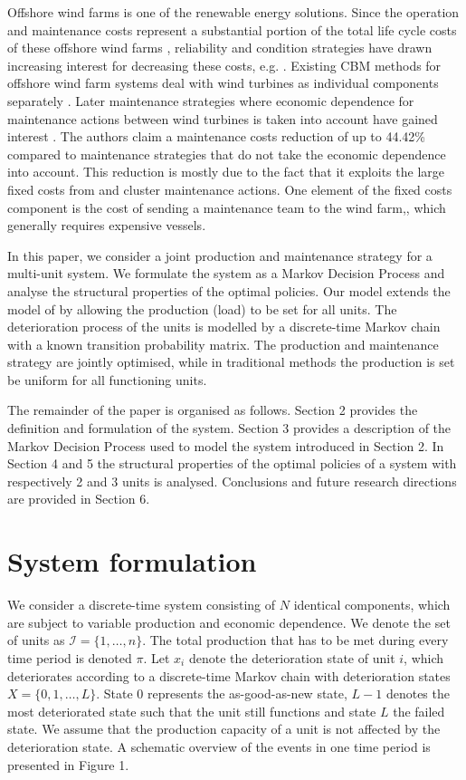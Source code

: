 \documentclass[a4paper,12pt]{article}
\begin{document}
Offshore wind farms is one of the renewable energy solutions. Since the operation and maintenance costs represent a substantial portion of the total life cycle costs of these offshore wind farms \cite{hau2003wind}, reliability and condition strategies have drawn increasing interest for decreasing these costs, e.g. \cite{krokoszinski2003efficiency}. Existing CBM methods for offshore wind farm systems deal with wind turbines as individual components separately \citep{avner2007reliability}. Later maintenance strategies where economic dependence for maintenance actions between wind turbines is taken into account have gained interest \citep{tian2011condition}. The authors claim a maintenance costs reduction of up to 44.42\% compared to maintenance strategies that do not take the economic dependence into account. This reduction is mostly due to the fact that it exploits the large fixed costs from and cluster maintenance actions. One element of the fixed costs component is the cost of sending a maintenance team to the wind farm,, which generally requires expensive vessels.

In this paper, we consider a joint production and maintenance strategy for a multi-unit system. We formulate the system as a Markov Decision Process and analyse the structural properties of the optimal policies. Our model extends the model of \cite{OLDEKEIZER2018319} by allowing the production (load) to be set for all units. The deterioration process of the units is modelled by a discrete-time Markov chain with a known transition probability matrix. The production and maintenance strategy are jointly optimised, while in traditional methods the production is set be uniform for all functioning units. 

The remainder of the paper is organised as follows. Section 2 provides the definition and formulation of the system. Section 3 provides a description of the Markov Decision Process used to model the system introduced in Section 2. In Section 4 and 5 the structural properties of the optimal policies of a system with respectively 2 and 3 units is analysed. Conclusions and future research directions are provided in Section 6.


\section{System formulation}
We consider a discrete-time system consisting of $N$ identical components, which are subject to variable production and economic dependence. We denote the set of units as $\mathcal{I} = \{1, \dots, n\}$. The total production that has to be met during every time period is denoted $\pi$.  Let $x_i$ denote the deterioration state of unit $i$, which deteriorates according to a discrete-time Markov chain with deterioration states $X = \{0, 1, \dots, L\}$. State $0$ represents the as-good-as-new state, $L-1$ denotes the most deteriorated state such that the unit still functions and state $L$ the failed state. We assume that the production capacity of a unit is not affected by the deterioration state. A schematic overview of the events in one time period is presented in Figure 1.
\end{document}
